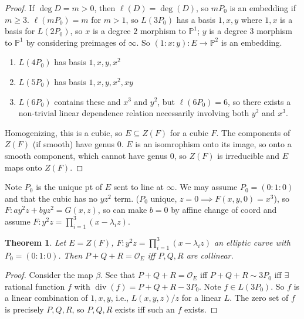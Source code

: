 \documentclass{article}
\theoremstyle{definition}
\theoremstyle{remark}
\theoremstyle{plain}
\newtheorem{thm}[defn]{Theorem}
\newcommand{\PP}{\mathbb{P}}
\newcommand{\divi}{\operatorname{div}}
\begin{document}
\begin{proof}
    If $\deg D=m>0$, then $\ell(D)=\deg(D)$, so $mP_0$ is an embedding if $m\ge 3$. $\ell(mP_0)=m$ for $m>1$, so $L(3P_0)$ has a basis $1,x,y$ where $1,x$ is a basis for $L(2P_0)$, so $x$ is a degree $2$ morphism to $\PP^1$; $y$ is a degree 3 morphism to $\PP^1$ by considering preimages of $\infty$. So $(1:x:y):E\to\PP^2$ is an embedding.

    \begin{enumerate}
        \item $L(4P_0)$ has basis $1,x,y,x^2$
        \item $L(5P_0)$ has basis $1,x,y,x^2,xy$
        \item $L(6P_0)$ contains these and $x^3$ and $y^2$, but $\ell(6P_0)=6$, so there exists a non-trivial linear dependence relation necessarily involving both $y^2$ and $x^3$.
    \end{enumerate}
    Homogenizing, this is a cubic, so $E\subseteq Z(F)$ for a cubic $F$. The components of $Z(F)$ (if smooth) have genus $0$. $E$ is an isomrophism onto its image, so onto a smooth component, which cannot have genus $0$, so $Z(F)$ is irreducible and $E$ maps onto $Z(F)$.
\end{proof}

Note $P_0$ is the unique pt of $E$ sent to line at $\infty$. We may assume $P_0=(0:1:0)$ and that the cubic has no $yz^2$ term. ($P_0$ unique, $z=0\implies F(x,y,0)=x^3$), so $F:ay^2z+byz^2=G(x,z)$, so can make $b=0$ by affine change of coord and assume $F:y^2z=\prod_{i=1}^3(x-\lambda_iz)$.
\begin{thm}
     Let $E=Z(F)$, $F:y^2z=\prod_{i=1}^3(x-\lambda_iz)$ an elliptic curve with $P_0=(0:1:0)$. Then $P+Q+R=\mathcal O_E$ iff $P,Q,R$ are collinear.
\end{thm}
\begin{proof}
    Consider the map $\beta$. See that $P+Q+R=\mathcal O_E$ iff $P+Q+R\sim 3P_0$ iff $\exists$ rational function $f$ with $\divi(f)=P+Q+R-3P_0$. Note $f\in L(3P_0)$. So $f$ is a linear combination of $1,x,y$, i.e., $L(x,y,z)/z$ for a linear $L$. The zero set of $f$ is precisely $P,Q,R$, so $P,Q,R$ exists iff such an $f$ exists.
\end{proof}
\end{document}
